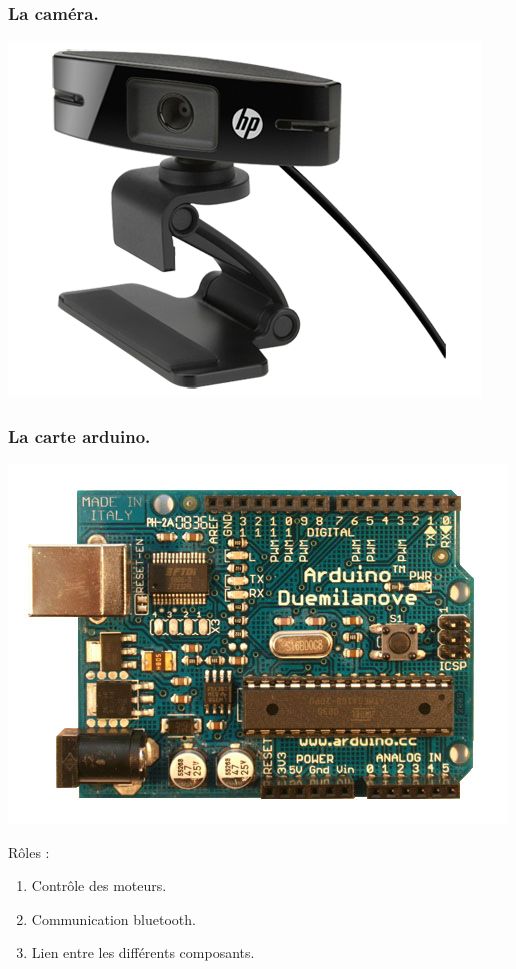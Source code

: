 \begin{frame}
    \frametitle{La caméra.}
    \begin{center}
        \includegraphics[width=0.8\linewidth]{rcs/cam.png}
    \end{center}
\end{frame}

\begin{frame}
    \frametitle{La carte arduino.}
    \begin{center}
        \includegraphics[scale=.3]{rcs/ardui.png}
    \end{center}
     {
        Rôles : \begin{enumerate}
            \pause \item Contrôle des moteurs.
            \pause \item Communication bluetooth.
            \pause \item Lien entre les différents composants.
        \end{enumerate}
    }
\end{frame}

